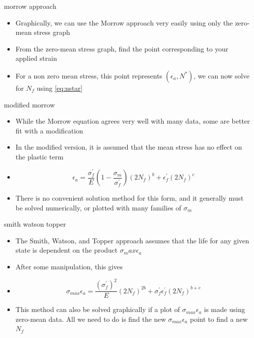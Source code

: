\documentclass[10pt]{beamer}
\begin{document}
\begin{frame}{morrow approach}
	\begin{itemize}[<+->]
		\item Graphically, we can use the Morrow approach very easily using only the zero-mean stress graph
		\item From the zero-mean stress graph, find the point corresponding to your applied strain
		\item For a non zero mean stress, this point represents $(\epsilon_a, N^*)$, we can now solve for $N_f$ using \ref{eq:nstar}
	\end{itemize}
\end{frame}

\begin{frame}{modified morrow}
	\begin{itemize}[<+->]
		\item While the Morrow equation agrees very well with many data, some are better fit with a modification
		\item In the modified version, it is assumed that the mean stress has no effect on the plastic term
		\item[] \begin{equation}
		\epsilon_a = \frac{\sigma_f^\prime}{E}\left(1-\frac{\sigma_m}{\sigma_f^\prime}\right)(2N_f)^b + \epsilon_f^\prime (2N_f)^c
		\end{equation}
		\item There is no convenient solution method for this form, and it generally must be solved numerically, or plotted with many families of $\sigma_m$
	\end{itemize}
\end{frame}

\begin{frame}{smith watson topper}
	\begin{itemize}[<+->]
		\item The Smith, Watson, and Topper approach assumes that the life for any given state is dependent on the product $\sigma_max \epsilon_a$
		\item After some manipulation, this gives
		\item[] \begin{equation}
		\sigma_{max} \epsilon_a = \frac{\left(\sigma_f^\prime\right)^2}{E}(2N_f)^{2b} + \sigma_f^\prime \epsilon_f^\prime (2N_f)^{b+c}
		\end{equation}
		\item This method can also be solved graphically if a plot of $\sigma_{max} \epsilon_a$ is made using zero-mean data. All we need to do is find the new $\sigma_{max} \epsilon_a$ point to find a new $N_f$
	\end{itemize}
\end{frame}
\end{document}
